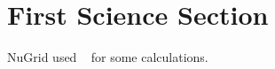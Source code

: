 \section{First Science Section}\label{s.science1} 

NuGrid used \MESA\ \citep{Paxton2011} for some calculations.
